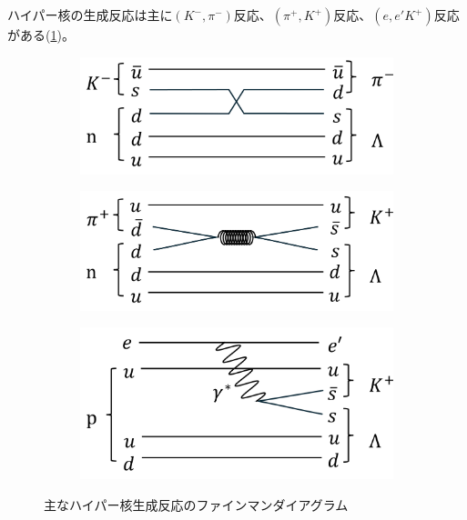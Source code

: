 \documentclass[a4paper,11pt,uplatex]{jsbook}
\begin{document}
ハイパー核の生成反応は主に$(K^-, \pi^-)$反応、$(\pi^+, K^+)$反応、$(e,e'K^+)$反応がある(\ref{fig:production})。
\begin{figure}[b]
  \centering
  \begin{subfigure}[b]{0.47\linewidth}
    \centering
    \includegraphics[width=\linewidth]{image/1-Kpi.png}
  \end{subfigure}
  \hfill
  \begin{subfigure}[b]{0.47\linewidth}
    \centering
    \includegraphics[width=\linewidth]{image/1-piK.png}
  \end{subfigure}
  \begin{subfigure}[b]{0.5\linewidth}
    \centering
    \includegraphics[width=\linewidth]{image/1-eeK.png}
  \end{subfigure}
  \caption[主なハイパー核生成反応のファインマンダイアグラム]{主なハイパー核生成反応のファインマンダイアグラム}
  \label{fig:production}
\end{figure}
\end{document}

